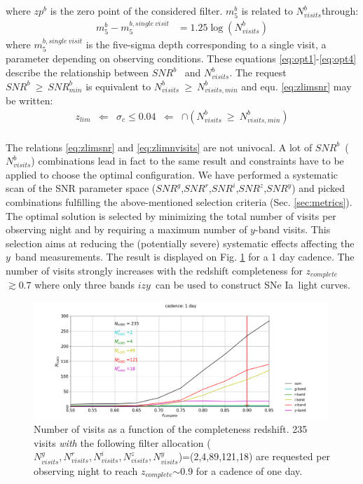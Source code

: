 \documentclass[skiphelvet,twocolumn]{lsstdescnote}
\newcommand{\snrb}{\mbox{$SNR^b$}}
\newcommand{\snrbmin}{\mbox{$SNR^b_{min}$}}
\newcommand{\snrg}{\mbox{$SNR^g$}}
\newcommand{\snrr}{\mbox{$SNR^r$}}
\newcommand{\snri}{\mbox{$SNR^i$}}
\newcommand{\snrz}{\mbox{$SNR^z$}}
\newcommand{\snry}{\mbox{$SNR^y$}}
\newcommand{\bi}{{$i$}}
\newcommand{\bz}{{$z$}}
\newcommand{\by}{{$y$}}
\newcommand{\sigc}{\mbox{$\sigma_c$}}
\newcommand{\zlim}{\mbox{$z_{lim}$}}
\newcommand{\sne}{{SNe Ia}}
\newcommand{\zcomp}{\mbox{$z_{complete}$}}
\newcommand{\seq}{$\sim$}
\newcommand{\nvisitsb}{\mbox{$N_{visits}^b$}}
\newcommand{\nvisitsbmin}{\mbox{$N_{visits,min}^b$}}
\newcommand{\nvisitsall}{$N_{visits}^g,N_{visits}^r,N_{visits}^i,N_{visits}^z,N_{visits}^y$}
\begin{document}
where $zp^b$ is the zero point of the considered filter.  $m_5^b$ is related to \nvisitsb through:
\begin{equation}
  \begin{aligned}
    m_5^b - m_5^{b, single~visit} & =  1.25 \log(N_{visits}^b)
    \end{aligned}
  \label{eq:opt4}
\end{equation}
where $m_5^{b, single~visit}$ is the five-sigma depth corresponding to a single visit, a parameter depending on observing conditions. These equations \eqref{eq:opt1}-\eqref{eq:opt4} describe the relationship between \snrb~ and \nvisitsb. The request $\snrb~\geq~\snrbmin$ is equivalent to $\nvisitsb~\geq~\nvisitsbmin$ and equ. \eqref{eq:zlimsnr} may be written:
\begin{equation}
  \begin{aligned}
    \zlim &\Longleftarrow & \sigc \leq 0.04 & \Longleftarrow &\cap (\nvisitsb~\geq~\nvisitsbmin)
    \end{aligned}
 \label{eq:zlimnvisits}
\end{equation}
\\
The relations \eqref{eq:zlimsnr} and \eqref{eq:zlimnvisits} are not univocal. A lot of \snrb~(\nvisitsb) combinations lead in fact to the same result and constraints have to be applied to choose the optimal configuration. We have performed a systematic scan of the SNR parameter space (\snrg,\snrr,\snri,\snrz,\snry) and picked combinations fulfilling the above-mentioned selection criteria (Sec. \ref{sec:metrics}). The optimal solution is selected by minimizing the total number of visits per observing night and by requiring a maximum number of \by-band visits. This selection aims at reducing the (potentially severe) systematic effects affecting the \by~band measurements. The result is displayed on Fig. \ref{fig:nvisits_zlim} for a 1 day cadence. The number of visits strongly increases with the redshift completeness for \zcomp$\gtrsim 0.7$ where only three bands \bi\bz\by~can be used to construct \sne~light curves.

\begin{figure}[htbp]
\begin{center}
  \includegraphics[width=0.99\textwidth]{nvisits_zlim.png}
 \caption{Number of visits as a function of the completeness redshift. 235 visits {\it with} the following filter allocation (\nvisitsall)=(2,4,89,121,18) are requested per observing night to reach \zcomp\seq0.9 for a cadence of one day.}\label{fig:nvisits_zlim}
\end{center}
\end{figure}
\end{document}

